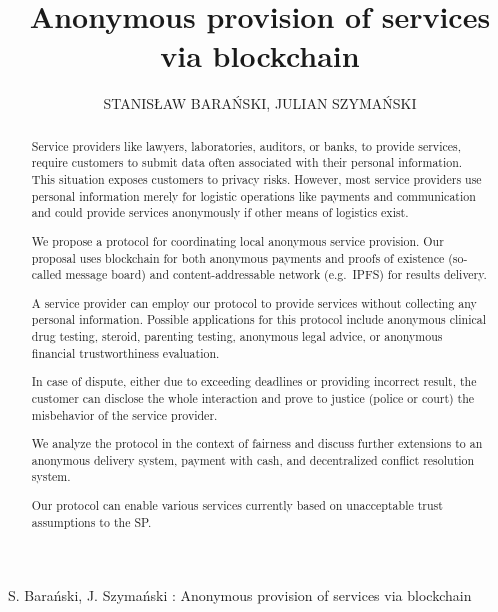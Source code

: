 \documentclass{ieeeaccess}
\begin{document}

\title{Anonymous provision of services via blockchain}
\author{\uppercase{Stanis\l{}aw Bara{\'n}ski},
\uppercase{Julian Szyma{\'n}ski } 
 }

\address[1]{Department of Electronic, Telecommunication and Informatics, Gdansk University of Technology, Narutowicza 11/12 Gdansk Poland (e-mail: stanislaw.baranski@pg.edu.pl, julian.szymanski@eti.pg.edu.pl}

 


{S. Bara{\'n}ski, J. Szyma{\'n}ski : 
Anonymous provision of services via blockchain}


\begin{abstract}
Service providers like lawyers, laboratories, auditors, or banks, to
provide services, require customers to submit data often
associated with their personal information. This situation exposes
customers to privacy risks. However, most service providers use personal information merely for logistic operations like payments
and communication and could provide services anonymously if other means of logistics exist.

We propose a protocol for coordinating local anonymous service
provision. Our proposal uses blockchain for both anonymous payments and proofs of existence (so-called message board) and content-addressable network (e.g.~IPFS) for results delivery.

A service provider can employ our protocol to provide
services without collecting any personal information. Possible
applications for this protocol include anonymous clinical drug testing,
steroid, parenting testing, anonymous legal advice, or
anonymous financial trustworthiness evaluation.

In case of dispute, either due to exceeding deadlines or providing
incorrect result, the customer can disclose the whole interaction and
prove to justice (police or court) the misbehavior of the service
provider.

We analyze the protocol in the context of fairness and discuss further
extensions to an anonymous delivery system, payment with cash, and
decentralized conflict resolution system.

Our protocol can enable various services currently based on unacceptable trust assumptions to the SP.
\end{abstract}
\end{document}
